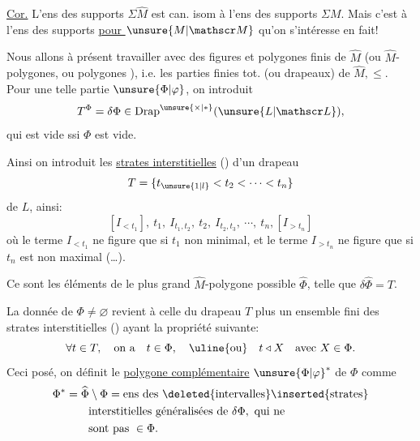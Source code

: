 
\uline{Cor.} L'ens des supports $\Sigma\widehat M$ est can. isom à l'ens des supports $\Sigma M$.
Mais c'est à l'ens des supports \uline{pour $\unsure{M|\mathscr M}$} qu'on s'intéresse en fait!

Nous allons à présent travailler avec des figures et polygones finis de $\widehat M$ (ou $\widehat M$-polygones, ou polygones ), i.e. les parties finies tot.  (ou drapeaux) de $\widehat M,\leq$. Pour une telle partie $\unsure{\Phi|\varphi}$, on introduit
\[
T^{\Phi}=\delta\Phi\in\operatorname{Drap}^{\unsure{\times|*}}(\unsure{L|\mathscr L}),
\]
qui est vide ssi $\Phi$ est vide.

Ainsi on introduit les \uline{strates interstitielles} () d'un drapeau
\[
T=\{t_{\unsure{1|l}}<t_2<\cdots<t_n\}
\]
de $L$, ainsi: 
\[
[I_{<t_1}],\ t_1,\ I_{t_1,t_2},\ t_2,\ I_{t_2,t_3},\ \cdots,\ t_n,[I_{>t_n}]
\]
où le terme $I_{<t_1}$ ne figure que si $t_1$ non minimal, et le terme $I_{>t_n}$ ne figure que si $t_n$ est non maximal (\ldots).

Ce sont les éléments de le plus grand $\widehat M$-polygone possible $\widehat\Phi$, telle que $\delta\widehat\Phi=T$.

La donnée de  $\Phi\ne\varnothing$ revient à celle du drapeau $T$ plus un ensemble fini\inserted{$\Phi$,} des strates interstitielles () ayant la propriété suivante:
\[
\forall t\in T,\quad\text{on a}\quad t\in\Phi,\quad\uline{\text{ou}}\quad t\triangleleft X\quad\text{avec }X\in\Phi.
\]
Ceci posé, on définit le \uline{polygone complémentaire} ${\unsure{\Phi|\varphi}}^{*}$ de $\Phi$ comme
\[
\begin{aligned}
\Phi^*&=\widehat\Phi\setminus\Phi=\text{ens des }\deleted{\text{intervalles}}\inserted{\text{strates}}\\
&\qquad\text{interstitielles généralisées de }\delta\Phi,\text{ qui ne}\\
&\qquad\text{sont pas }\in\Phi.
\end{aligned}
\]

